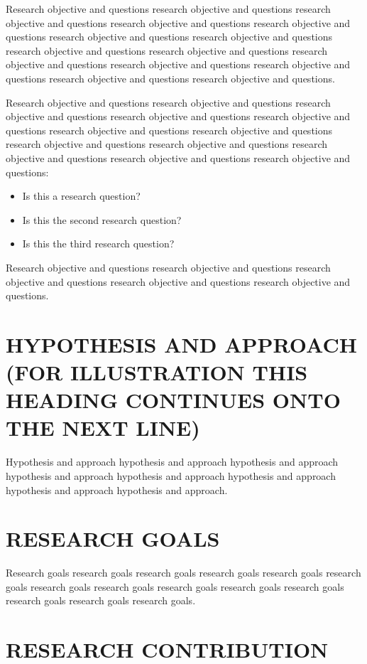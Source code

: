 Research objective and questions research objective and questions
research objective and questions research objective and questions
research objective and questions research objective and questions
research objective and questions research objective and questions
research objective and questions research objective and questions
research objective and questions research objective and questions
research objective and questions research objective and questions.

Research objective and questions research objective and questions
research objective and questions research objective and questions
research objective and questions research objective and questions
research objective and questions research objective and questions
research objective and questions research objective and questions
research objective and questions research objective and questions:

\begin{itemize}
\item Is this a research question?
\item Is this the second research question?
\item Is this the third research question?
\end{itemize}

Research objective and questions research objective and questions
research objective and questions research objective and questions
research objective and questions.

\section{HYPOTHESIS AND APPROACH (FOR ILLUSTRATION THIS HEADING
  CONTINUES ONTO THE NEXT LINE)}

Hypothesis and approach hypothesis and approach hypothesis and
approach hypothesis and approach hypothesis and approach hypothesis
and approach hypothesis and approach hypothesis and approach.

\section{RESEARCH GOALS}

Research goals research goals research goals research goals research
goals research goals research goals research goals research goals
research goals research goals research goals research goals research
goals.

\section{RESEARCH CONTRIBUTION}

